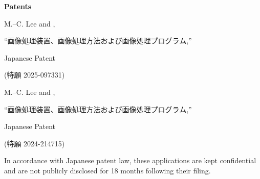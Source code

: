 \documentclass[a4paper,9pt]{extarticle}
\begin{document}
\noindent
\textbf{Patents}
\begin{enumerate}[label={[\arabic*]}, start=1]
    \item 
    M.--C. Lee and ,
    \begin{CJK}{UTF8}{min}``画像処理装置、画像処理方法および画像処理プログラム,''\end{CJK} 
    Japanese Patent \begin{CJK}{UTF8}{min}(特願 2025-097331)\end{CJK}
    \item 
    M.--C. Lee and ,
    \begin{CJK}{UTF8}{min}``画像処理装置、画像処理方法および画像処理プログラム,''\end{CJK} 
    Japanese Patent \begin{CJK}{UTF8}{min}(特願 2024-214715)\end{CJK}
    
    \item[*] In accordance with Japanese patent law, these applications are kept confidential and are not publicly disclosed for 18 months following their filing. \\
 
\end{enumerate} 



\end{document}

